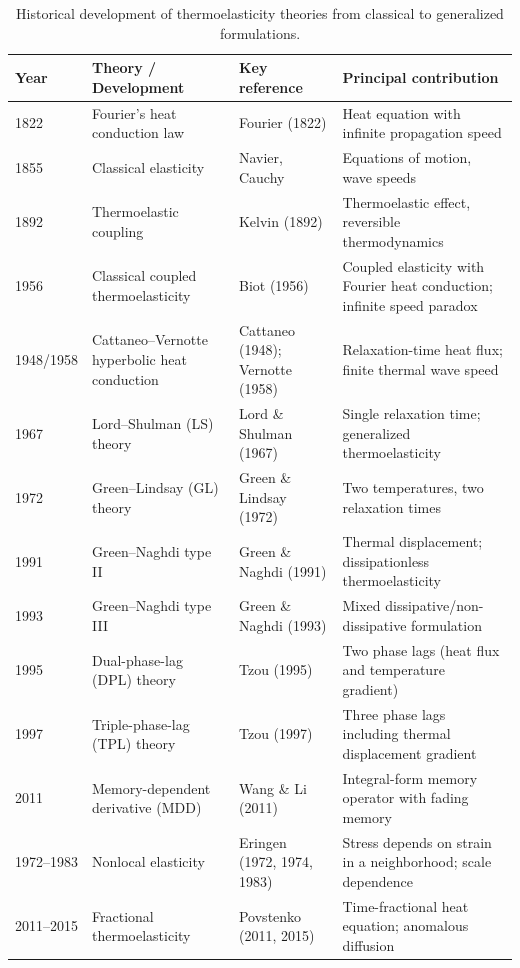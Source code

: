 \begin{table}[htbp]
\centering
\small
\caption{Historical development of thermoelasticity theories from classical to generalized formulations.}
\label{tab:T1_historical}
\begin{tabularx}{\textwidth}{@{}lXlX@{}}
\toprule
\textbf{Year} & \textbf{Theory / Development} & \textbf{Key reference} & \textbf{Principal contribution} \\
\midrule
1822 & Fourier's heat conduction law & Fourier (1822) & Heat equation with infinite propagation speed \\
1855 & Classical elasticity & Navier, Cauchy & Equations of motion, wave speeds \\
1892 & Thermoelastic coupling & Kelvin (1892) & Thermoelastic effect, reversible thermodynamics \\
1956 & Classical coupled thermoelasticity & Biot (1956) & Coupled elasticity with Fourier heat conduction; infinite speed paradox \\
1948/1958 & Cattaneo--Vernotte hyperbolic heat conduction & Cattaneo (1948); Vernotte (1958) & Relaxation-time heat flux; finite thermal wave speed \\
1967 & Lord--Shulman (LS) theory & Lord \& Shulman (1967) & Single relaxation time; generalized thermoelasticity \\
1972 & Green--Lindsay (GL) theory & Green \& Lindsay (1972) & Two temperatures, two relaxation times \\
1991 & Green--Naghdi type II & Green \& Naghdi (1991) & Thermal displacement; dissipationless thermoelasticity \\
1993 & Green--Naghdi type III & Green \& Naghdi (1993) & Mixed dissipative/non-dissipative formulation \\
1995 & Dual-phase-lag (DPL) theory & Tzou (1995) & Two phase lags (heat flux and temperature gradient) \\
1997 & Triple-phase-lag (TPL) theory & Tzou (1997) & Three phase lags including thermal displacement gradient \\
2011 & Memory-dependent derivative (MDD) & Wang \& Li (2011) & Integral-form memory operator with fading memory \\
1972--1983 & Nonlocal elasticity & Eringen (1972, 1974, 1983) & Stress depends on strain in a neighborhood; scale dependence \\
2011--2015 & Fractional thermoelasticity & Povstenko (2011, 2015) & Time-fractional heat equation; anomalous diffusion \\
\bottomrule
\end{tabularx}
\end{table}
